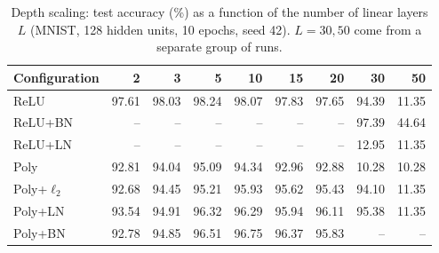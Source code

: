 \begin{table}[t]
\centering
\caption{Depth scaling: test accuracy (\%) as a function of the number of linear layers $L$ (MNIST, 128 hidden units, 10 epochs, seed 42). $L=30,50$ come from a separate group of runs.}
\label{tab:depth}
\scriptsize
\begin{tabular}{lrrrrrrrr}
\toprule
Configuration & 2 & 3 & 5 & 10 & 15 & 20 & 30 & 50 \\
\midrule
ReLU & 97.61 & 98.03 & 98.24 & 98.07 & 97.83 & 97.65 & 94.39 & 11.35 \\
ReLU+BN & -- & -- & -- & -- & -- & -- & 97.39 & 44.64 \\
ReLU+LN & -- & -- & -- & -- & -- & -- & 12.95 & 11.35 \\
Poly & 92.81 & 94.04 & 95.09 & 94.34 & 92.96 & 92.88 & 10.28 & 10.28 \\
Poly+$\ell_2$ & 92.68 & 94.45 & 95.21 & 95.93 & 95.62 & 95.43 & 94.10 & 11.35 \\
Poly+LN & 93.54 & 94.91 & 96.32 & 96.29 & 95.94 & 96.11 & 95.38 & 11.35 \\
Poly+BN & 92.78 & 94.85 & 96.51 & 96.75 & 96.37 & 95.83 & -- & -- \\
\bottomrule
\end{tabular}
\end{table}
